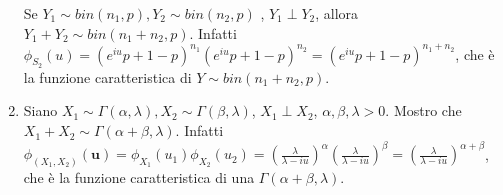 \documentclass{article}
\begin{document}
\begin{enumerate}
Se $Y_{1}\sim bin\left( n_{1},p\right) ,Y_{2}\sim bin\left( n_{2},p\right) $%
, $Y_{1}\perp Y_{2}$, allora $Y_{1}+Y_{2}\sim bin\left( n_{1}+n_{2},p\right) 
$. Infatti $\phi _{S_{2}}\left( u\right) =\left( e^{iu}p+1-p\right)
^{n_{1}}\left( e^{iu}p+1-p\right) ^{n_{2}}=\left( e^{iu}p+1-p\right)
^{n_{1}+n_{2}}$, che \`{e} la funzione caratteristica di $Y\sim bin\left(
n_{1}+n_{2},p\right) $.

\item Siano $X_{1}\sim \Gamma \left( \alpha ,\lambda \right) ,X_{2}\sim
\Gamma \left( \beta ,\lambda \right) $, $X_{1}\perp X_{2}$, $\alpha ,\beta
,\lambda >0$. Mostro che $X_{1}+X_{2}\sim \Gamma \left( \alpha +\beta
,\lambda \right) $. Infatti $\phi _{\left( X_{1},X_{2}\right) }\left( 
\mathbf{u}\right) =\phi _{X_{1}}\left( u_{1}\right) \phi _{X_{2}}\left(
u_{2}\right) =\left( \frac{\lambda }{\lambda -iu}\right) ^{\alpha }\left( 
\frac{\lambda }{\lambda -iu}\right) ^{\beta }=\left( \frac{\lambda }{\lambda
-iu}\right) ^{\alpha +\beta }$, che \`{e} la funzione caratteristica di una $%
\Gamma \left( \alpha +\beta ,\lambda \right) $.
\end{enumerate}
\end{document}
